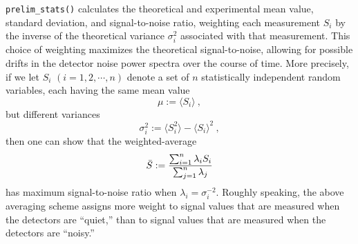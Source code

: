 {\tt prelim\_stats()} calculates the theoretical and experimental
mean value, standard deviation, and signal-to-noise ratio,
weighting each measurement $S_i$ by the inverse of the theoretical 
variance $\sigma_i^2$ associated with that measurement.
This choice of weighting maximizes the theoretical signal-to-noise,
allowing for possible drifts in the detector noise power spectra
over the course of time.
More precisely, if we let $S_i$ $(i=1,2,\cdots,n)$ denote a set of
$n$ statistically independent random variables, each having the same 
mean value
%
\begin{equation}
\mu:=\langle S_i\rangle\ ,
\end{equation}
%
but different variances
%
\begin{equation}
\sigma_i^2:=\langle S_i^2\rangle - \langle S_i\rangle^2\ ,
\end{equation}
%
then one can show that the weighted-average
%
\begin{equation}
\bar S:={\sum_{i=1}^n \lambda_i S_i\over \sum_{j=1}^n \lambda_j}
\end{equation}
%
has maximum signal-to-noise ratio when $\lambda_i=\sigma_i^{-2}$.
Roughly speaking, the above averaging scheme assigns more weight to 
signal values that are measured when the detectors are ``quiet,'' than
to signal values that are measured when the detectors are ``noisy.''

